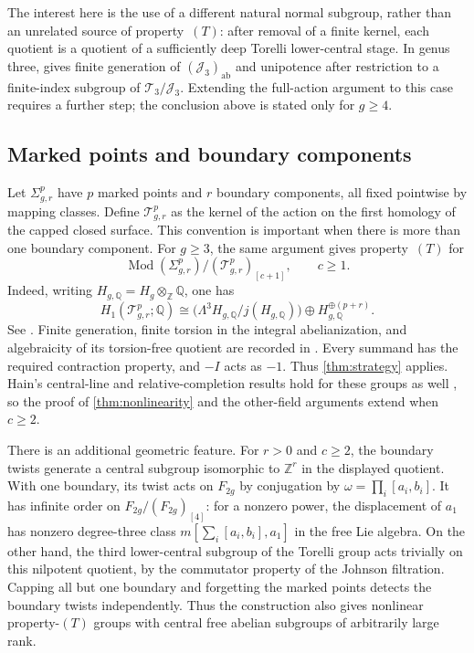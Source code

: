 \documentclass[11pt,a4paper]{article}
\theoremstyle{definition}
\newcommand{\Q}{\mathbb Q}
\newcommand{\Z}{\mathbb Z}
\newcommand{\Mod}{\operatorname{Mod}}
\newcommand{\ab}{\mathrm{ab}}
\newcommand{\rt}{(T)}
\begin{document}
The interest here is the use of a different natural normal
subgroup, rather than an unrelated source of property~\(\rt\):
after removal of a finite kernel, each quotient is a quotient
of a sufficiently deep Torelli lower-central stage.
In genus three, \cite[Theorems~A and~E]{GaifullinJohnson} gives
finite generation of \((\mathcal J_3)_{\ab}\) and unipotence
after restriction to a finite-index subgroup of
\(\mathcal T_3/\mathcal J_3\). Extending the full-action argument
to this case requires a further step; the conclusion above
is stated only for \(g\ge4\).

\subsection{Marked points and boundary components}

Let \(\Sigma_{g,r}^{p}\) have \(p\) marked points and \(r\)
boundary components, all fixed pointwise by mapping classes.
Define \(\mathcal T_{g,r}^{p}\) as the kernel of the action on
the first homology of the capped closed surface. This convention
is important when there is more than one boundary component.
For \(g\ge3\), the same argument gives property~\(\rt\) for
\[
 \Mod(\Sigma_{g,r}^{p})/
             (\mathcal T_{g,r}^{p})_{[c+1]},\qquad c\ge1.
\]
Indeed, writing \(H_{g,\Q}=H_g\otimes_\Z\Q\), one has
\[
 H_1(\mathcal T_{g,r}^{p};\Q)
 \cong
 \bigl(\Lambda^3H_{g,\Q}/j(H_{g,\Q})\bigr)
       \oplus H_{g,\Q}^{\oplus(p+r)}.
\]
See \cite[Propositions~3.5 and~4.6]{Hain}.
Finite generation, finite torsion in the integral abelianization,
and algebraicity of its torsion-free quotient are recorded in
\cite[proof of Proposition~3.4]{HainMatsumoto}.
Every summand has the required contraction property, and
\(-I\) acts as \(-1\). Thus \cref{thm:strategy} applies.
Hain's central-line and relative-completion results hold for
these groups as well \cite[Theorems~3.4 and~4.10]{Hain}, so
the proof of \cref{thm:nonlinearity} and the other-field
arguments extend when \(c\ge2\).

There is an additional geometric feature. For \(r>0\) and
\(c\ge2\), the boundary twists generate a central subgroup
isomorphic to \(\Z^r\) in the displayed quotient.
With one boundary, its twist acts on \(F_{2g}\) by conjugation
by \(\omega=\prod_i[a_i,b_i]\). It has infinite order on
\(F_{2g}/(F_{2g})_{[4]}\): for a nonzero power, the displacement
of \(a_1\) has nonzero degree-three class
\(m[\sum_i[a_i,b_i],a_1]\) in the free Lie algebra.
On the other hand, the third lower-central subgroup of the
Torelli group acts trivially on this nilpotent quotient, by
the commutator property of the Johnson filtration.
Capping all but one boundary and forgetting the marked points
detects the boundary twists independently. Thus the construction
also gives nonlinear property-\(\rt\) groups with central
free abelian subgroups of arbitrarily large rank.
\end{document}

